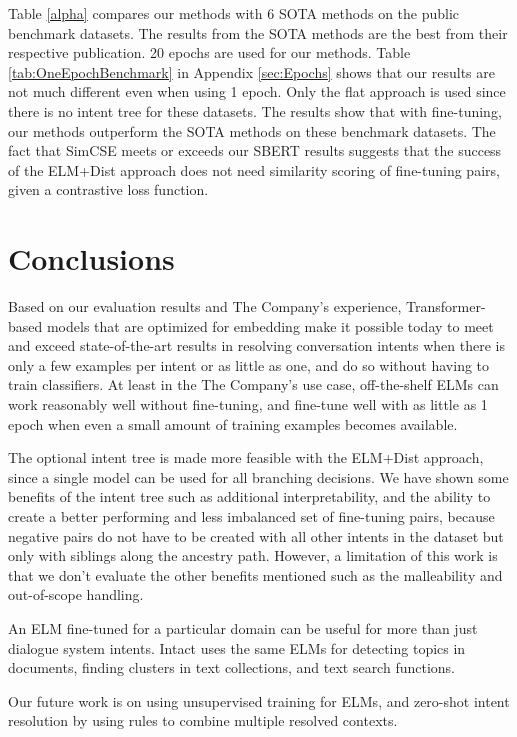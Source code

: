 \documentclass[sigconf, anonymous=true]{acmart}
\begin{document}
Table \ref{alpha} compares our methods with 6 SOTA methods on the public benchmark datasets. The results from the SOTA methods are the best from their respective publication. 20 epochs are used for our methods. Table \ref{tab:OneEpochBenchmark} in Appendix \ref{sec:Epochs} shows that our results are not much different even when using 1 epoch. Only the flat approach is used since there is no intent tree for these datasets. The results show that with fine-tuning, our methods outperform the SOTA methods on these benchmark datasets. The fact that SimCSE meets or exceeds our SBERT results suggests that the success of the ELM+Dist approach does not need similarity scoring of fine-tuning pairs, given a contrastive loss function.  


\section{Conclusions}
Based on our evaluation results and The Company's experience, Transformer-based models that are optimized for embedding make it possible today to meet and exceed state-of-the-art results in resolving conversation intents when there is only a few examples per intent or as little as one, and do so without having to train classifiers. At least in the The Company's use case, off-the-shelf ELMs can work reasonably well without fine-tuning, and fine-tune well with as little as 1 epoch when even a small amount of training examples becomes available. 

The optional intent tree is made more feasible with the ELM+Dist approach, since a single model can be used for all branching decisions. We have shown some benefits of the intent tree such as additional interpretability, and the ability to create a better performing and less imbalanced set of fine-tuning pairs, because negative pairs do not have to be created with all other intents in the dataset but only with siblings along the ancestry path. However, a limitation of this work is that we don't evaluate the other benefits mentioned such as the malleability and out-of-scope handling.

An ELM fine-tuned for a particular domain can be useful for more than just dialogue system intents. Intact uses the same ELMs for detecting topics in documents, finding clusters in text collections, and text search functions.

Our future work is on using unsupervised training for ELMs, and zero-shot intent resolution by using rules to combine multiple resolved contexts. 
\end{document}
